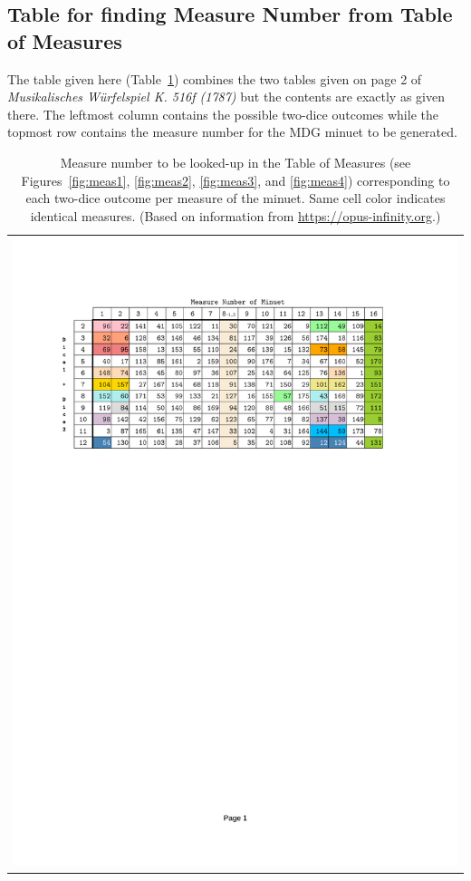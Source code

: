 \documentclass[letterpaper,x11names,svgnames,10pt]{article}
\begin{document}
\subsection{Table for finding Measure Number from Table of Measures}\label{tableFind}
The table given here (Table~\ref{fig:0tab1}) combines the two tables given on page 2 of {\it Musikalisches W\"{u}rfelspiel K. 516f (1787)} but the contents are exactly as given there.  The leftmost column contains the possible two-dice outcomes while the topmost row contains the measure number for the MDG minuet to be generated.

\begin{table}[H]
	\centering
	\begin{tabular}{c}
		\centering
		\includegraphics[clip=true,trim=0.90in 7.75in 1.25in 1.00in,scale=0.90]{12TAB}
	\end{tabular}
	\caption{Measure number to be looked-up in the Table of Measures (see Figures~\ref{fig:meas1}, \ref{fig:meas2}, \ref{fig:meas3}, and \ref{fig:meas4}) corresponding to each two-dice outcome per measure of the minuet. Same cell color indicates identical measures. (Based on information from \href{https://opus-infinity.org/dice_games/mozart_waltz/tables/}{https://opus-infinity.org}.)}
	\label{fig:0tab1}
\end{table}
\end{document}
